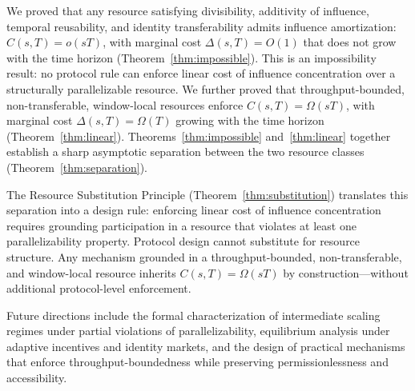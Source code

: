 \documentclass[10pt,journal,compsoc]{IEEEtran}
\theoremstyle{remark}
\begin{document}
	We proved that any resource satisfying divisibility,
	additivity of influence, temporal reusability, and
	identity transferability admits influence amortization:
	$C(s,T) = o(sT)$, with marginal cost $\Delta(s,T) = O(1)$
	that does not grow with the time horizon
	(Theorem~\ref{thm:impossible}).
	This is an impossibility result: no protocol rule can
	enforce linear cost of influence concentration over
	a structurally parallelizable resource.
	We further proved that throughput-bounded,
	non-transferable, window-local resources enforce
	$C(s,T) = \Omega(sT)$, with marginal cost
	$\Delta(s,T) = \Omega(T)$ growing with the time horizon
	(Theorem~\ref{thm:linear}).
	Theorems~\ref{thm:impossible} and~\ref{thm:linear}
	together establish a sharp asymptotic separation
	between the two resource classes
	(Theorem~\ref{thm:separation}).
	
	The Resource Substitution Principle
	(Theorem~\ref{thm:substitution}) translates this
	separation into a design rule: enforcing linear
	cost of influence concentration requires grounding
	participation in a resource that violates at least
	one parallelizability property.
	Protocol design cannot substitute for resource
	structure.
	Any mechanism grounded in a throughput-bounded,
	non-transferable, and window-local resource inherits
	$C(s,T) = \Omega(sT)$ by construction---without
	additional protocol-level enforcement.
	
	Future directions include the formal characterization
	of intermediate scaling regimes under partial
	violations of parallelizability, equilibrium analysis
	under adaptive incentives and identity markets, and
	the design of practical mechanisms that enforce
	throughput-boundedness while preserving
	permissionlessness and accessibility.
	
	
	
	
	
	
	
	
	
	
	
\end{document}
